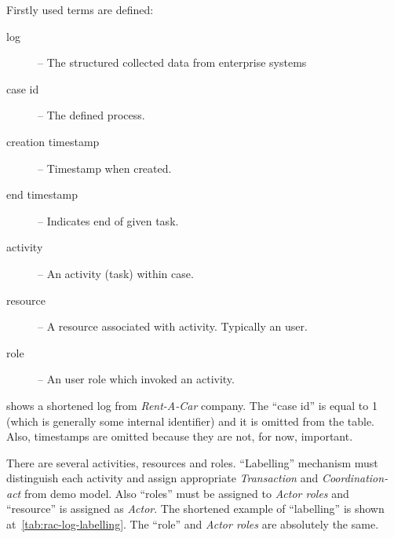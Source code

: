 Firstly used terms are defined:
\begin{description}
\item[log] -- The structured collected data from enterprise systems
\item[case id] -- The defined process.
\item[creation timestamp] -- Timestamp when created.
\item[end timestamp] -- Indicates end of given task.
\item[activity] -- An activity (task) within case.
\item[resource] -- A resource associated with activity. Typically an user.
\item[role] -- An user role which invoked an activity.
\end{description}

 shows a shortened log from \textit{Rent-A-Car} company. The ``case id'' is equal to 1 (which is generally some internal identifier) and it is omitted from the table. Also, timestamps are omitted because they are not, for now, important.  

There are several activities, resources and roles. ``Labelling'' mechanism must distinguish each activity and assign appropriate \textit{Transaction} and \textit{Coordination-act} from \gls{demo} model. Also ``roles'' must be assigned to \textit{Actor roles} and ``resource'' is assigned as \textit{Actor}. The shortened example of ``labelling'' is shown at~\cref{tab:rac-log-labelling}. The ``role'' and \textit{Actor roles} are absolutely the same. 

